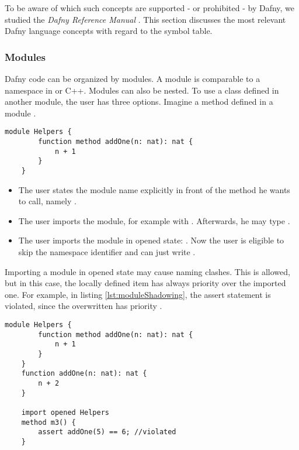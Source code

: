 To be aware of which such concepts are supported - or prohibited - by Dafny, we studied the \textit{Dafny Reference Manual} \cite{dafnyReferenceManual}.
This section discusses the most relevant Dafny language concepts with regard to the symbol table.

\subsubsection{Modules}
Dafny code can be organized by modules.
A module is comparable to a namespace in \CsharpWithSpace or C++.
Modules can also be nested.
To use a class defined in another module, the user has three options.
Imagine a method  defined in a module .

\begin{lstlisting}[language=dafny, caption={Module Example}, captionpos=b, label={lst:addOneMethod}]
    module Helpers {
        function method addOne(n: nat): nat {
            n + 1
        }
    }
\end{lstlisting}

\begin{itemize}
    \item The user states the module name explicitly in front of the method he wants to call, \linebreak namely .
    \item The user imports the module, for example with .
    Afterwards, he may type .
    \item The user imports the module in opened state: .
    Now the user is eligible to skip the namespace identifier and can just write .
\end{itemize}

Importing a module in opened state may cause naming clashes.
This is allowed, but in this case, the locally defined item has always priority over the imported one.
For example, in listing \ref{lst:moduleShadowing}, the assert statement is violated, since the overwritten  has priority \cite{functionVSMethod}.

\begin{lstlisting}[language = dafny, caption={Naming Clash}, captionpos=b, label={lst:moduleShadowing}]
    module Helpers {
        function method addOne(n: nat): nat {
            n + 1
        }
    }
    function addOne(n: nat): nat {
        n + 2
    }

    import opened Helpers
    method m3() {
        assert addOne(5) == 6; //violated
    }

\end{lstlisting}

